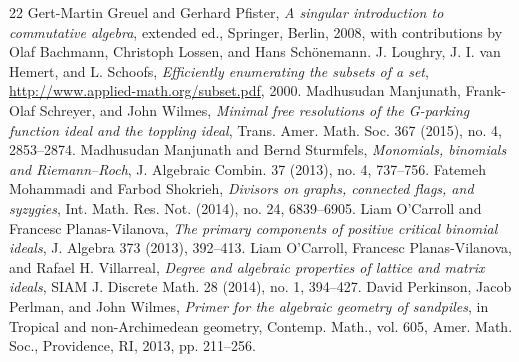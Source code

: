 \begin{thebibliography}{22}
 Gert-Martin Greuel and Gerhard Pfister, \emph{A singular introduction to commutative algebra}, extended ed., Springer, Berlin, 2008, with contributions by Olaf Bachmann, Christoph Lossen, and Hans Sch\"{o}nemann.
 J. Loughry, J. I. van Hemert, and L. Schoofs, \emph{Efficiently enumerating the subsets of a set}, \url{http://www.applied-math.org/subset.pdf}, 2000.
 Madhusudan Manjunath, Frank-Olaf Schreyer, and John Wilmes, \emph{Minimal free resolutions of the G-parking function ideal and the toppling ideal}, Trans. Amer. Math. Soc. 367 (2015), no. 4, 2853--2874.
 Madhusudan Manjunath and Bernd Sturmfels, \emph{Monomials, binomials and Riemann--Roch}, J. Algebraic Combin. 37 (2013), no. 4, 737--756.
 Fatemeh Mohammadi and Farbod Shokrieh, \emph{Divisors on graphs, connected flags, and syzygies}, Int. Math. Res. Not. (2014), no. 24, 6839--6905.
 Liam O'Carroll and Francesc Planas-Vilanova, \emph{The primary components of positive critical binomial ideals}, J. Algebra 373 (2013), 392--413.
 Liam O'Carroll, Francesc Planas-Vilanova, and Rafael H. Villarreal, \emph{Degree and algebraic properties of lattice and matrix ideals}, SIAM J. Discrete Math. 28 (2014), no. 1, 394--427.
 David Perkinson, Jacob Perlman, and John Wilmes, \emph{Primer for the algebraic geometry of sandpiles}, in Tropical and non-Archimedean geometry, Contemp. Math., vol. 605, Amer. Math. Soc., Providence, RI, 2013, pp. 211--256.
\end{thebibliography}

